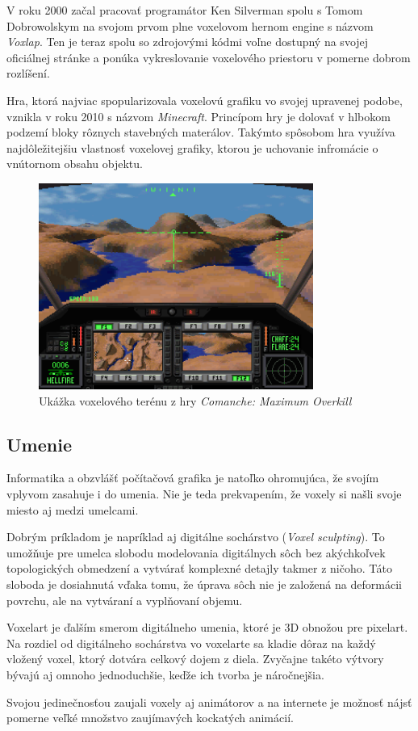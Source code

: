 V roku 2000 začal pracovať programátor Ken Silverman spolu s Tomom Dobrowolskym na svojom prvom plne voxelovom hernom engine s názvom \textit{Voxlap}. \cite{Voxlap} Ten je teraz spolu so zdrojovými kódmi voľne dostupný na svojej oficiálnej stránke a ponúka vykreslovanie voxelového priestoru v pomerne dobrom rozlíšení.

Hra, ktorá najviac spopularizovala voxelovú grafiku vo svojej upravenej podobe, vznikla v roku 2010 s názvom \textit{Minecraft}. Princípom hry je dolovať v hlbokom podzemí bloky rôznych stavebných materálov. Takýmto spôsobom hra využíva najdôležitejšiu vlastnosť voxelovej grafiky, ktorou je uchovanie infromácie o vnútornom obsahu objektu. 

\begin{figure}[ht!]
	\centering
	\includegraphics[width=90mm]{comanche.png}
	\caption[Ukážka voxelového terénu z hry Comanche: Maximum Overkill]{Ukážka voxelového terénu z hry \textit{Comanche: Maximum Overkill}}
	\label{comanche}
\end{figure}

\subsection{Umenie}
Informatika a obzvlášť počítačová grafika je natoľko ohromujúca, že svojím vplyvom zasahuje i do umenia. Nie je teda prekvapením, že voxely si našli svoje miesto aj medzi umelcami. 

Dobrým príkladom je napríklad aj digitálne sochárstvo (\textit{Voxel sculpting}). To umožňuje pre umelca slobodu modelovania digitálnych sôch bez akýchkoľvek topologických obmedzení a vytvárať komplexné detajly takmer z ničoho. Táto sloboda je dosiahnutá vďaka tomu, že úprava sôch nie je založená na deformácii povrchu, ale na vytváraní a vyplňovaní objemu. \cite{Sculpting}

Voxelart je ďalším smerom digitálneho umenia, ktoré je 3D obnožou pre pixelart. Na rozdiel od digitálneho sochárstva vo voxelarte sa kladie dôraz na každý vložený voxel, ktorý dotvára celkový dojem z diela. Zvyčajne takéto výtvory bývajú aj omnoho jednoduchšie, keďže ich tvorba je náročnejšia.

Svojou jedinečnosťou zaujali voxely aj animátorov a na internete je možnosť nájsť pomerne veľké množstvo zaujímavých kockatých animácií.
